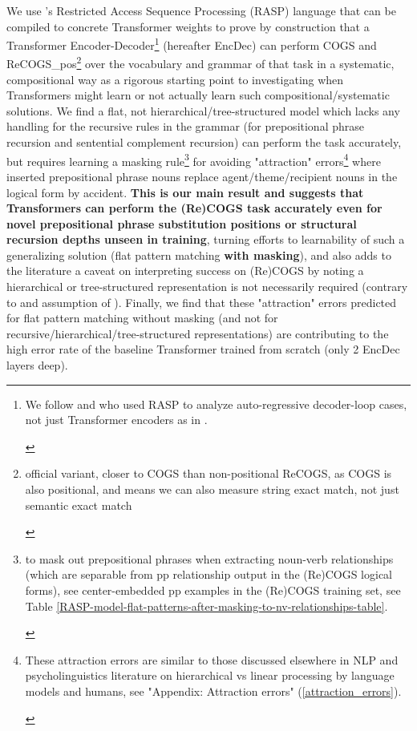 \documentclass[11pt]{article}
\begin{document}
We use \cite{Weiss2021}'s Restricted Access Sequence Processing (RASP) language that can be compiled to concrete Transformer weights to prove by construction that a Transformer Encoder-Decoder\footnote{\begin{footnotesize}We follow \cite{Zhou2024} and \cite{friedmanrepresentingrulebasedchatbotstransformers} who used RASP to analyze auto-regressive decoder-loop cases, not just Transformer encoders as in \cite{Weiss2021}.\end{footnotesize}} (hereafter EncDec) can perform COGS and ReCOGS\_pos\footnote{\begin{footnotesize}official variant, closer to COGS than non-positional ReCOGS, as COGS is also positional, and means we can also measure string exact match, not just semantic exact match\end{footnotesize}} over the vocabulary and grammar of that task in a systematic, compositional way as a rigorous starting point to investigating when Transformers might learn or not actually learn such compositional/systematic solutions. We find a flat, not hierarchical/tree-structured model which lacks any handling for the recursive rules in the grammar (for prepositional phrase recursion and sentential complement recursion) can perform the task accurately, but requires learning a masking rule\footnote{\begin{footnotesize}to mask out prepositional phrases when extracting noun-verb relationships (which are separable from pp relationship output in the (Re)COGS logical forms), see center-embedded pp examples in the (Re)COGS training set, see Table \ref{RASP-model-flat-patterns-after-masking-to-nv-relationships-table}.\end{footnotesize}} for avoiding "attraction" errors\footnote{\begin{footnotesize}These attraction errors are similar to those discussed elsewhere in NLP and psycholinguistics literature on hierarchical vs linear processing by language models and humans, see "Appendix: Attraction errors" (\ref{attraction_errors}).\end{footnotesize}} where inserted prepositional phrase nouns replace agent/theme/recipient nouns in the logical form by accident. \textbf{This is our main result and suggests that Transformers can perform the (Re)COGS task accurately even for novel prepositional phrase substitution positions or structural recursion depths unseen in training}, turning efforts to learnability of such a generalizing solution (flat pattern matching \textbf{with masking}), and also adds to the literature a caveat on interpreting success on (Re)COGS by noting a hierarchical or tree-structured representation is not necessarily required (contrary to \cite{KimLinzen2020} and assumption of \cite{murty2022characterizingintrinsiccompositionalitytransformers}). Finally, we find that these "attraction" errors predicted for flat pattern matching without masking (and not for recursive/hierarchical/tree-structured representations) are contributing to the high error rate of the \cite{Wu2023} baseline Transformer trained from scratch (only 2 EncDec layers deep).
\end{document}
